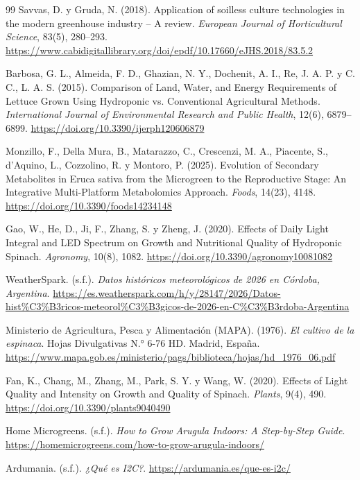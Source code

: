 \begin{thebibliography}{99}
Savvas, D. y Gruda, N. (2018). Application of soilless culture technologies in the modern greenhouse industry -- A review. \textit{European Journal of Horticultural Science}, 83(5), 280--293. \url{https://www.cabidigitallibrary.org/doi/epdf/10.17660/eJHS.2018/83.5.2}

Barbosa, G. L., Almeida, F. D., Ghazian, N. Y., Dochenit, A. I., Re, J. A. P. y C. C., L. A. S. (2015). Comparison of Land, Water, and Energy Requirements of Lettuce Grown Using Hydroponic vs. Conventional Agricultural Methods. \textit{International Journal of Environmental Research and Public Health}, 12(6), 6879--6899. \url{https://doi.org/10.3390/ijerph120606879}

Monzillo, F., Della Mura, B., Matarazzo, C., Crescenzi, M. A., Piacente, S., d'Aquino, L., Cozzolino, R. y Montoro, P. (2025). Evolution of Secondary Metabolites in Eruca sativa from the Microgreen to the Reproductive Stage: An Integrative Multi-Platform Metabolomics Approach. \textit{Foods}, 14(23), 4148. \url{https://doi.org/10.3390/foods14234148}

Gao, W., He, D., Ji, F., Zhang, S. y Zheng, J. (2020). Effects of Daily Light Integral and LED Spectrum on Growth and Nutritional Quality of Hydroponic Spinach. \textit{Agronomy}, 10(8), 1082. \url{https://doi.org/10.3390/agronomy10081082}

WeatherSpark. (s.f.). \textit{Datos históricos meteorológicos de 2026 en Córdoba, Argentina}. \url{https://es.weatherspark.com/h/y/28147/2026/Datos-hist\%C3\%B3ricos-meteorol\%C3\%B3gicos-de-2026-en-C\%C3\%B3rdoba-Argentina}

Ministerio de Agricultura, Pesca y Alimentación (MAPA). (1976). \textit{El cultivo de la espinaca}. Hojas Divulgativas N.° 6-76 HD. Madrid, España. \url{https://www.mapa.gob.es/ministerio/pags/biblioteca/hojas/hd_1976_06.pdf}

Fan, K., Chang, M., Zhang, M., Park, S. Y. y Wang, W. (2020). Effects of Light Quality and Intensity on Growth and Quality of Spinach. \textit{Plants}, 9(4), 490. \url{https://doi.org/10.3390/plants9040490}

Home Microgreens. (s.f.). \textit{How to Grow Arugula Indoors: A Step-by-Step Guide}. \url{https://homemicrogreens.com/how-to-grow-arugula-indoors/}

Ardumania. (s.f.). \textit{¿Qué es I2C?}. \url{https://ardumania.es/que-es-i2c/}


\end{thebibliography}
